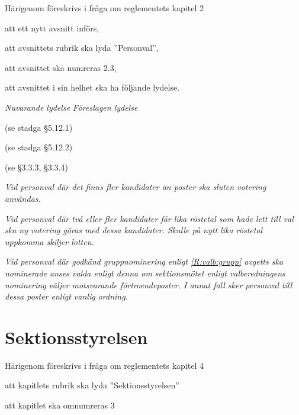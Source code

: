 \documentclass{article}
\newenvironment{lydelse}
    {\begin{paracol}{2}%
        \emph{Nuvarande lydelse}%
        \switchcolumn%
        \emph{Föreslagen lydelse}%
    \end{paracol}%
    \begin{enumerate}[label=\thesubsection.\arabic*]%
    \begin{paracol}{2}%
    }{\end{paracol}\end{enumerate}}
\begin{document}
Härigenom föreskrivs i fråga om reglementets kapitel 2

\begin{dels}
    \item att ett nytt avsnitt införs,
    \item att avsnittets rubrik ska lyda ''Personval'',
    \item att avsnittet ska numreras 2.3,
    \item att avsnittet i sin helhet ska ha följande lydelse.
\end{dels}

\begin{lydelse}
    \setcounter{subsection}{1}

    \item[] (se stadga \S 5.12.1)
    
    \vspace{1.2em}
    \item[] (se stadga \S 5.12.2)
    
    \vspace{3.4em}
    \item[] (se \S3.3.3, \S3.3.4)
    
    \setcounter{subsection}{0}
    
    \switchcolumn
    \item \emph{Vid personval där det finns fler kandidater än poster ska sluten votering användas.}
    
    \item \emph{Vid personval där två eller fler kandidater får lika röstetal som hade lett till val ska ny votering göras med dessa kandidater.
    Skulle på nytt lika röstetal uppkomma skiljer lotten.}
    
    \item \emph{Vid personval där godkänd gruppnominering enligt \ref{R:valb:grupp} avgetts ska nominerade anses valda enligt denna om sektionsmötet enligt valberedningens nominering väljer motsvarande förtroendeposter.
    I annat fall sker personval till dessa poster enligt vanlig ordning.}
    \label{R:SektmoteGruppnom}
\end{lydelse}


\section{Sektionsstyrelsen}

Härigenom föreskrivs i fråga om reglementets kapitel 4

\begin{dels}
    \item att kapitlets rubrik ska lyda ''Sektionsstyrelsen''
    \item att kapitlet ska omnumreras 3
\end{dels}
\end{document}
